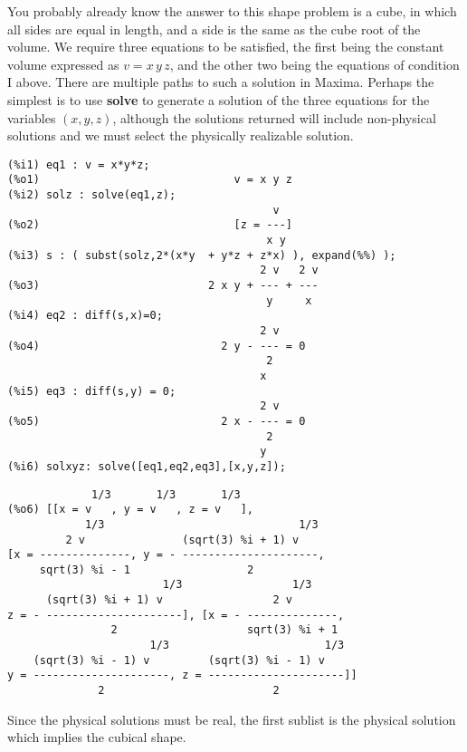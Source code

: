 \documentclass[12pt]{article}
\begin{document}
You probably already know the answer to this shape problem is a cube, in which all sides are equal in
  length, and a side is the same as the cube root of the volume.  
We require three equations to be satisfied, the first being the constant volume
  expressed as $v = x\,y\,z$,  and the other two being the equations of condition I above.  
There are multiple paths to such a solution in Maxima.
Perhaps the simplest is to use \textbf{solve} to generate a solution of the
  three equations for the variables $(x,y,z)$, although the solutions returned
  will include non-physical solutions and we must select the physically realizable
  solution.
\small
\begin{verbatim}
(%i1) eq1 : v = x*y*z;
(%o1)                              v = x y z
(%i2) solz : solve(eq1,z);
                                         v
(%o2)                              [z = ---]
                                        x y
(%i3) s : ( subst(solz,2*(x*y  + y*z + z*x) ), expand(%%) );
                                       2 v   2 v
(%o3)                          2 x y + --- + ---
                                        y     x
(%i4) eq2 : diff(s,x)=0;
                                       2 v
(%o4)                            2 y - --- = 0
                                        2
                                       x
(%i5) eq3 : diff(s,y) = 0;
                                       2 v
(%o5)                            2 x - --- = 0
                                        2
                                       y
(%i6) solxyz: solve([eq1,eq2,eq3],[x,y,z]);
\end{verbatim}
\newpage
\begin{verbatim}
             1/3       1/3       1/3
(%o6) [[x = v   , y = v   , z = v   ], 
            1/3                              1/3
         2 v               (sqrt(3) %i + 1) v
[x = --------------, y = - ---------------------, 
     sqrt(3) %i - 1                  2
                        1/3                 1/3
      (sqrt(3) %i + 1) v                 2 v
z = - ---------------------], [x = - --------------, 
                2                    sqrt(3) %i + 1
                      1/3                        1/3
    (sqrt(3) %i - 1) v         (sqrt(3) %i - 1) v
y = ---------------------, z = ---------------------]]
              2                          2
\end{verbatim}
\normalsize
Since the physical solutions must be real, the first sublist is the physical
  solution which implies the cubical shape.
  
\end{document}
